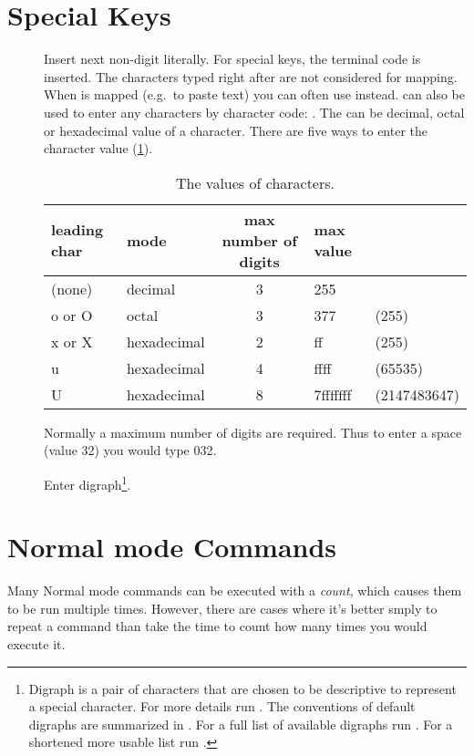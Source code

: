 \section{Special Keys}
\begin{description}
  \item[] Insert next non-digit literally. For special keys, the terminal code is inserted. The characters typed right after  are not considered for mapping. When  is mapped (e.g.\ to paste text) you can often use  instead.  can also be used to enter any characters by character code: . The  can be decimal, octal or hexadecimal value of a character. There are five ways to enter the character value (\cref{tab:characterValues}).
    \begin{table}[htbp]
      \caption{The values of characters.}
      \label{tab:characterValues}
      \begin{tabular}{llcll}
	\toprule
	leading char & mode        & max number of digits & max value &              \\ 
	\midrule
	(none)       & decimal     & 3                    & 255       &              \\ 
	o or O       & octal       & 3                    & 377       & (255)        \\ 
	x or X       & hexadecimal & 2                    & ff        & (255)        \\ 
	u            & hexadecimal & 4                    & ffff      & (65535)      \\ 
	U            & hexadecimal & 8                    & 7fffffff  & (2147483647) \\
	\bottomrule
      \end{tabular}
    \end{table}
    Normally a maximum number of digits are required. Thus to enter a space (value 32) you would type 032.
  \item[] Enter digraph\footnote{Digraph is a pair of characters that are chosen to be descriptive to represent a special character. For more details run . The conventions of default digraphs are summarized in .  For a full list of available digraphs run . For a shortened more usable list run .}.
\end{description}
\section{Normal mode Commands}
Many Normal mode commands can be executed with a \emph{count}, which causes them to be run multiple times. However, there are cases where it's better smply to repeat a command than take the time to count how many times you would execute it.

